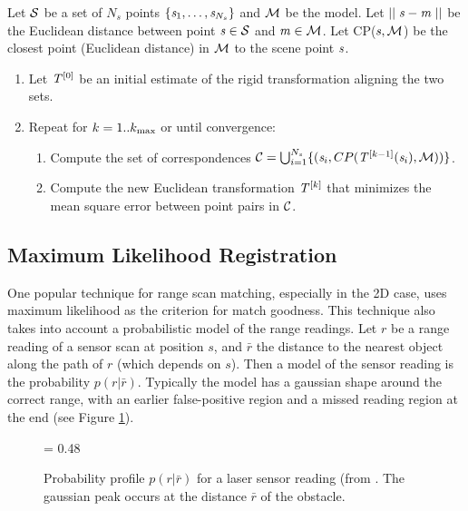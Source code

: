 \documentclass[twocolumn,oneside]{book}
\begin{document}
Let ${\cal S}$ be a set of $N_s$ points $\{ {\bf \it s}_1, \dots, {\bf \it s}_{N_s} \}$
and ${\cal M}$ be the model.
Let $ \mid\mid {\bf \it s} - {\bf \it m} \mid\mid $ be the Euclidean distance
between point ${\bf \it s} \in {\cal S}$ and 
${\bf \it m} \in {\cal M}$.
Let CP(${\bf \it s},{\cal M}$) be the closest point (Euclidean distance)
in ${\cal M}$ to the scene point ${\bf \it s}$.
\begin{enumerate}
\item Let ${\bf \it T}^{[0]}$ be an initial estimate of the rigid transformation aligning the two sets.
\item Repeat for $k = 1 .. k_{\rm max}$ or until convergence:
\begin{enumerate}

\item Compute the set of correspondences 
${\cal C} = \bigcup_{i=1}^{N_s} \{ ( {\bf \it s}_i,
CP({\bf \it T}^{[k-1]}({\bf \it s}_i),{\cal M})) \}$.

\item Compute the new Euclidean transformation ${\bf \it T}^{[k]}$ that minimizes
the mean square error between point pairs in ${\cal C}$.

\end{enumerate}
\end{enumerate}


\subsection{Maximum Likelihood Registration} 

One popular technique for range scan matching, especially in the 2D
case, uses maximum likelihood as the criterion for match goodness.
This technique also takes into account a probabilistic model of the
range readings.  Let $r$ be a range reading of a sensor scan at
position $s$, and $\bar r$ the distance to the nearest object along
the path of $r$ (which depends on $s$).  Then a model of the sensor
reading is the probability $p(r|\bar r)$.  Typically the model has a
gaussian shape around the correct range, with an earlier
false-positive region and a missed reading region at the end (see Figure
\ref{prob.ch22}).  

\begin{figure}[htb]
{\epsfxsize = 0.48\textwidth {}}
\caption{Probability profile $p(r|\bar r)$ for a laser sensor reading
(from \cite{thrun05}.  The gaussian peak occurs at the distance $\bar
r$ of the obstacle. 
\label{prob.ch22}}
\end{figure}
\end{document}

